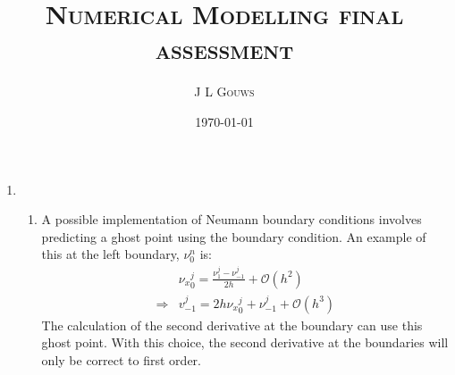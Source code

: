 \documentclass[12pt,a4]{article}
\title{
\textsc{Numerical Modelling final assessment}
}
\author{\textsc{J L Gouws}
}
\date{\today
\\[1cm]}
\begin{document}
\thispagestyle{empty}

\maketitle

\begin{enumerate}
  \item
    \begin{enumerate}
      \item
        A possible implementation of Neumann boundary conditions involves predicting a ghost point using the boundary condition.
        An example of this at the left boundary, $\nu_0^n$ is:
        \begin{align*}
                      & {\nu_x}_0^j = \frac{\nu_1^j - \nu_{-1}^j}{2 h} + \mathscr{O} (h^2)\\
          \Rightarrow & v_{-1}^j = 2 h {\nu_x}_0^j + \nu_{-1}^j + \mathscr{O} (h^3)
        \end{align*}
        The calculation of the second derivative at the boundary can use this ghost point.
        With this choice, the second derivative at the boundaries will only be correct to first order.


\end{enumerate}
\end{enumerate}
\end{document}
